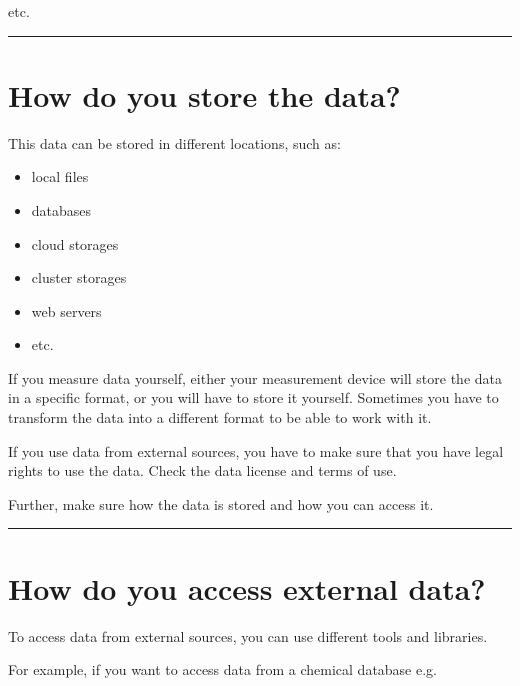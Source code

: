\documentclass[
  letterpaper,
  DIV=11,
  numbers=noendperiod]{scrreprt}
\providecommand{\tightlist}{%
  \setlength{\itemsep}{0pt}\setlength{\parskip}{0pt}}\usepackage{longtable,booktabs,array}
\begin{document}
etc.

\begin{center}\rule{0.5\linewidth}{0.5pt}\end{center}

\section*{How do you store the data?}\label{how-do-you-store-the-data}


This data can be stored in different locations, such as:

\begin{itemize}
\tightlist
\item
  local files
\item
  databases
\item
  cloud storages
\item
  cluster storages
\item
  web servers
\item
  etc.
\end{itemize}

If you measure data yourself, either your measurement device will store
the data in a specific format, or you will have to store it yourself.
Sometimes you have to transform the data into a different format to be
able to work with it.

If you use data from external sources, you have to make sure that you
have legal rights to use the data. Check the data license and terms of
use.

Further, make sure how the data is stored and how you can access it.

\begin{center}\rule{0.5\linewidth}{0.5pt}\end{center}

\section*{How do you access external
data?}\label{how-do-you-access-external-data}


To access data from external sources, you can use different tools and
libraries.

For example, if you want to access data from a chemical database e.g.~
\end{document}
